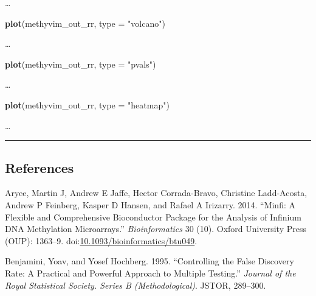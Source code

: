 \documentclass[9pt,a4paper,]{extarticle}
\newenvironment{Shaded}{\begin{snugshade}}{\end{snugshade}}
\newcommand{\KeywordTok}[1]{\textcolor[rgb]{0.13,0.29,0.53}{\textbf{#1}}}
\newcommand{\DataTypeTok}[1]{\textcolor[rgb]{0.13,0.29,0.53}{#1}}
\newcommand{\StringTok}[1]{\textcolor[rgb]{0.31,0.60,0.02}{#1}}
\newcommand{\NormalTok}[1]{#1}
\theoremstyle{definition}
\theoremstyle{definition}
\theoremstyle{definition}
\theoremstyle{remark}
\begin{document}
\ldots{}

\begin{Shaded}
\begin{Highlighting}[]
\KeywordTok{plot}\NormalTok{(methyvim_out_rr, }\DataTypeTok{type =} \StringTok{"volcano"}\NormalTok{)}
\end{Highlighting}
\end{Shaded}

\ldots{}

\begin{Shaded}
\begin{Highlighting}[]
\KeywordTok{plot}\NormalTok{(methyvim_out_rr, }\DataTypeTok{type =} \StringTok{"pvals"}\NormalTok{)}
\end{Highlighting}
\end{Shaded}

\ldots{}

\begin{Shaded}
\begin{Highlighting}[]
\KeywordTok{plot}\NormalTok{(methyvim_out_rr, }\DataTypeTok{type =} \StringTok{"heatmap"}\NormalTok{)}
\end{Highlighting}
\end{Shaded}

\ldots{}

\begin{center}\rule{0.5\linewidth}{\linethickness}\end{center}

\subsection*{References}\label{references}

\hypertarget{refs}{}
\hypertarget{ref-aryee2014minfi}{}
Aryee, Martin J, Andrew E Jaffe, Hector Corrada-Bravo, Christine
Ladd-Acosta, Andrew P Feinberg, Kasper D Hansen, and Rafael A Irizarry.
2014. ``Minfi: A Flexible and Comprehensive Bioconductor Package for the
Analysis of Infinium DNA Methylation Microarrays.''
\emph{Bioinformatics} 30 (10). Oxford University Press (OUP): 1363--9.
doi:\href{https://doi.org/10.1093/bioinformatics/btu049}{10.1093/bioinformatics/btu049}.

\hypertarget{ref-benjamini1995controlling}{}
Benjamini, Yoav, and Yosef Hochberg. 1995. ``Controlling the False
Discovery Rate: A Practical and Powerful Approach to Multiple Testing.''
\emph{Journal of the Royal Statistical Society. Series B
(Methodological)}. JSTOR, 289--300.
\end{document}
